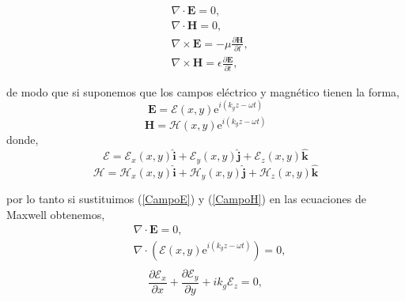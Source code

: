 \documentclass[11pt,fleqn]{book} %
\begin{document}
 \begin{equation*}
  \begin{split}
  & \nabla \cdot \textbf{E}=0,\\
  & \nabla \cdot \textbf{H}=0,\\
  & \nabla \times \textbf{E}=-\mu\frac{\partial \textbf{H}}{\partial t},\\
  & \nabla \times \textbf{H}=\epsilon\frac{\partial \textbf{E}}{\partial t},
  \end{split}
  \end{equation*}

  de modo que si suponemos que los campos el\'ectrico y magn\'etico tienen la forma,
  \begin{equation} \label{CampoE}
  \textbf{E}=	\boldsymbol{\mathcal{E}}(x,y) \text{e}^{i(k_{g}z-\omega t)}
  \end{equation}
\begin{equation} \label{CampoH}
  \textbf{H}=	\boldsymbol{\mathcal{H}}(x,y) \text{e}^{i(k_{g}z-\omega t)}
  \end{equation}
  donde,
\begin{equation}
  \boldsymbol{\mathcal{E}}=\mathcal{E}_{x} (x,y) \hat{\textbf{i}}+\mathcal{E}_{y} (x,y) \hat{\textbf{j}}+\mathcal{E}_{z} (x,y) \hat{\textbf{k}}
  \end{equation}
  \begin{equation}
  \boldsymbol{\mathcal{H}}=\mathcal{H}_{x} (x,y) \hat{\textbf{i}}+\mathcal{H}_{y} (x,y) \hat{\textbf{j}}+\mathcal{H}_{z} (x,y) \hat{\textbf{k}}
  \end{equation}

  por lo tanto si sustituimos (\ref{CampoE}) y (\ref{CampoH}) en las ecuaciones de Maxwell obtenemos,
   \begin{equation*}
  \begin{split}
  & \nabla \cdot \textbf{E}=0,\\
  & \nabla \cdot \left( \boldsymbol{\mathcal{E}}(x,y) \text{e}^{i(k_{g}z-\omega t)} \right)=0,\\
  \end{split}
  \end{equation*}
  \begin{equation} \label{1}
  \frac{\partial \mathcal{E}_x}{\partial x}+\frac{\partial \mathcal{E}_y}{\partial y}+ik_g\mathcal{E}_z=0,
  \end{equation}
\end{document}
